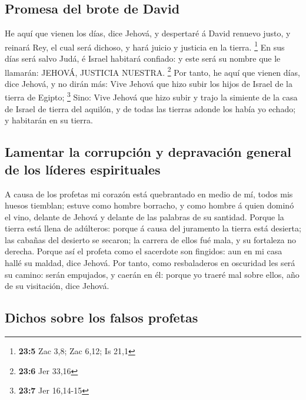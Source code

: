 \hypertarget{promesa-del-brote-de-david}{%
\subsection{Promesa del brote de
David}\label{promesa-del-brote-de-david}}

 He aquí que vienen los días, dice Jehová, y despertaré á
David renuevo justo, y reinará Rey, el cual será dichoso, y hará juicio
y justicia en la tierra. \footnote{\textbf{23:5} Zac 3,8; Zac 6,12; Is
  21,1}  En sus días será salvo Judá, é Israel habitará
confiado: y este será su nombre que le llamarán: JEHOVÁ, JUSTICIA
NUESTRA. \footnote{\textbf{23:6} Jer 33,16}  Por tanto, he
aquí que vienen días, dice Jehová, y no dirán más: Vive Jehová que hizo
subir los hijos de Israel de la tierra de Egipto; \footnote{\textbf{23:7}
  Jer 16,14-15}  Sino: Vive Jehová que hizo subir y trajo la
simiente de la casa de Israel de tierra del aquilón, y de todas las
tierras adonde los había yo echado; y habitarán en su tierra.

\hypertarget{lamentar-la-corrupciuxf3n-y-depravaciuxf3n-general-de-los-luxedderes-espirituales}{%
\subsection{Lamentar la corrupción y depravación general de los líderes
espirituales}\label{lamentar-la-corrupciuxf3n-y-depravaciuxf3n-general-de-los-luxedderes-espirituales}}

 A causa de los profetas mi corazón está quebrantado en
medio de mí, todos mis huesos tiemblan; estuve como hombre borracho, y
como hombre á quien dominó el vino, delante de Jehová y delante de las
palabras de su santidad.  Porque la tierra está llena de
adúlteros: porque á causa del juramento la tierra está desierta; las
cabañas del desierto se secaron; la carrera de ellos fué mala, y su
fortaleza no derecha.  Porque así el profeta como el
sacerdote son fingidos: aun en mi casa hallé su maldad, dice Jehová.
 Por tanto, como resbaladeros en oscuridad les será su
camino: serán empujados, y caerán en él: porque yo traeré mal sobre
ellos, año de su visitación, dice Jehová.

\hypertarget{dichos-sobre-los-falsos-profetas}{%
\subsection{Dichos sobre los falsos
profetas}\label{dichos-sobre-los-falsos-profetas}}

